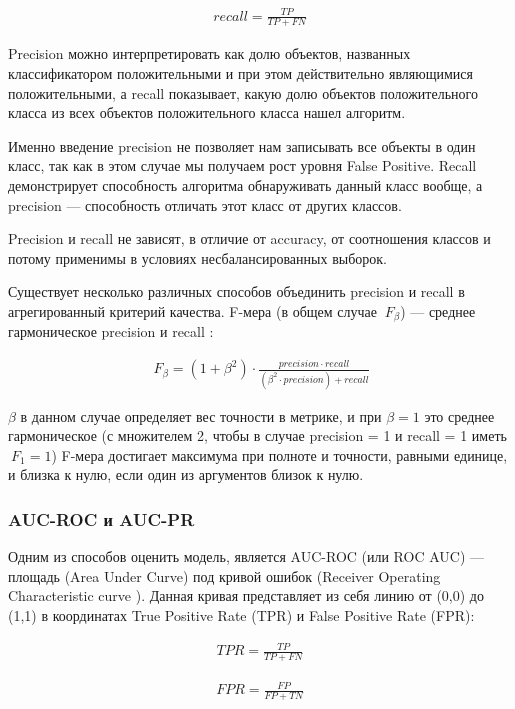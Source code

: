 \documentclass{article}
\begin{document}
	\begin{align*}
	recall = \frac{TP}{TP + FN}
	\end{align*}
	
	Precision можно интерпретировать как долю объектов, названных классификатором положительными и при этом действительно являющимися положительными, а recall показывает, какую долю объектов положительного класса из всех объектов положительного класса нашел алгоритм.
	
	Именно введение precision не позволяет нам записывать все объекты в один класс, так как в этом случае мы получаем рост уровня False Positive. Recall демонстрирует способность алгоритма обнаруживать данный класс вообще, а precision — способность отличать этот класс от других классов.
	
	Precision и recall не зависят, в отличие от accuracy, от соотношения классов и потому применимы в условиях несбалансированных выборок.
	
	Существует несколько различных способов объединить precision и recall в агрегированный критерий качества. F-мера (в общем случае $\ F_\beta$) — среднее гармоническое precision и recall :
	
	\begin{align*}
	\ F_\beta = (1 + \beta^2) \cdot \frac{precision \cdot recall}{(\beta^2 \cdot precision) + recall}
	\end{align*}
	
	$\beta$ в данном случае определяет вес точности в метрике, и при $\beta = 1$ это среднее гармоническое (с множителем 2, чтобы в случае precision = 1 и recall = 1 иметь $\ F_1 = 1$)
	F-мера достигает максимума при полноте и точности, равными единице, и близка к нулю, если один из аргументов близок к нулю.
	
	\subsubsection{AUC-ROC и AUC-PR}
	
	Одним из способов оценить модель, является AUC-ROC (или ROC AUC) — площадь (Area Under Curve) под кривой ошибок (Receiver Operating Characteristic curve ). Данная кривая представляет из себя линию от (0,0) до (1,1) в координатах True Positive Rate (TPR) и False Positive Rate (FPR):
	
	\begin{align*}
		TPR = \frac{TP}{TP + FN}
	\end{align*}	
	
	\begin{align*}
		FPR = \frac{FP}{FP + TN}
	\end{align*}
\end{document}
